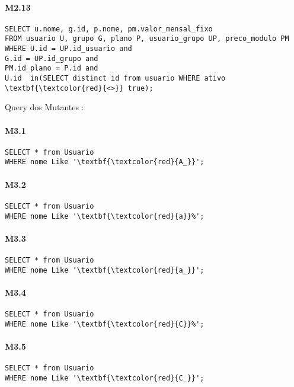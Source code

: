 \paragraph{M2.13}
\begin{Verbatim}
SELECT u.nome, g.id, p.nome, pm.valor_mensal_fixo
FROM usuario U, grupo G, plano P, usuario_grupo UP, preco_modulo PM
WHERE U.id = UP.id_usuario and
G.id = UP.id_grupo and
PM.id_plano = P.id and
U.id  in(SELECT distinct id from usuario WHERE ativo \textbf{\textcolor{red}{<>}} true);
\end{Verbatim}

Query dos Mutantes :


\paragraph{M3.1}	 	 	 	
\begin{Verbatim}
SELECT * from Usuario
WHERE nome Like '\textbf{\textcolor{red}{A_}}';
\end{Verbatim}

\paragraph{M3.2}
\begin{Verbatim}
SELECT * from Usuario
WHERE nome Like '\textbf{\textcolor{red}{a}}%';
\end{Verbatim}

\paragraph{M3.3}
\begin{Verbatim}
SELECT * from Usuario
WHERE nome Like '\textbf{\textcolor{red}{a_}}';
\end{Verbatim}

\paragraph{M3.4}
\begin{Verbatim}
SELECT * from Usuario
WHERE nome Like '\textbf{\textcolor{red}{C}}%';
\end{Verbatim}

\paragraph{M3.5}
\begin{Verbatim}
SELECT * from Usuario
WHERE nome Like '\textbf{\textcolor{red}{C_}}';
\end{Verbatim}